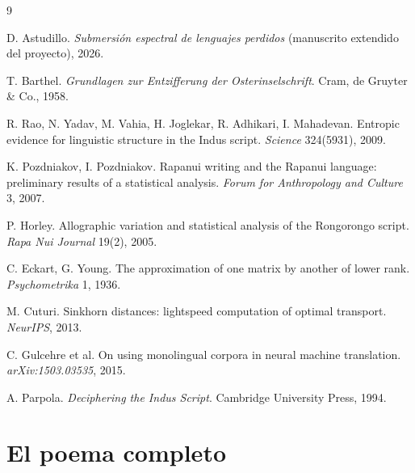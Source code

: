 \documentclass[10pt,twocolumn]{article}
\begin{document}
\begin{thebibliography}{9}\small

 D. Astudillo.
\emph{Submersión espectral de lenguajes perdidos} (manuscrito extendido
del proyecto), 2026.

 T. Barthel.
\emph{Grundlagen zur Entzifferung der Osterinselschrift}. Cram, de
Gruyter \& Co., 1958.

 R. Rao, N. Yadav, M. Vahia, H. Joglekar, R. Adhikari,
I. Mahadevan. Entropic evidence for linguistic structure in the Indus
script. \emph{Science} 324(5931), 2009.

 K. Pozdniakov, I. Pozdniakov. Rapanui writing and
the Rapanui language: preliminary results of a statistical analysis.
\emph{Forum for Anthropology and Culture} 3, 2007.

 P. Horley. Allographic variation and statistical
analysis of the Rongorongo script. \emph{Rapa Nui Journal} 19(2), 2005.

 C. Eckart, G. Young. The approximation of one matrix by
another of lower rank. \emph{Psychometrika} 1, 1936.

 M. Cuturi. Sinkhorn distances: lightspeed computation
of optimal transport. \emph{NeurIPS}, 2013.

 C. Gulcehre et al. On using monolingual corpora in
neural machine translation. \emph{arXiv:1503.03535}, 2015.

 A. Parpola. \emph{Deciphering the Indus Script}.
Cambridge University Press, 1994.

\end{thebibliography}

\onecolumn
\appendix
\section{El poema completo}
\label{app:poema}
\end{document}
